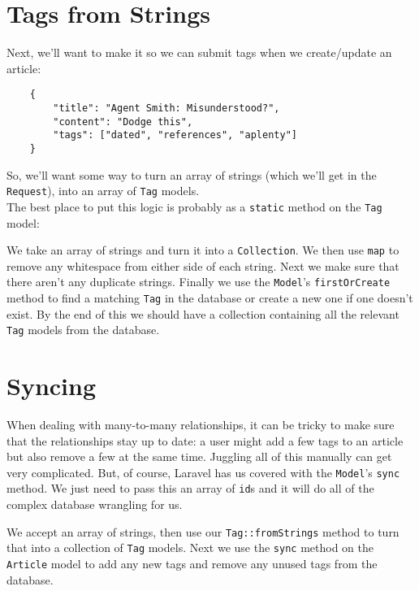 \pagebreak


\section{Tags from Strings}

Next, we'll want to make it so we can submit tags when we create/update an article:

\begin{verbatim}
    {
        "title": "Agent Smith: Misunderstood?",
        "content": "Dodge this",
        "tags": ["dated", "references", "aplenty"]
    }
\end{verbatim}


So, we'll want some way to turn an array of strings (which we'll get in the \texttt{Request}), into an array of \texttt{Tag} models.
\\

The best place to put this logic is probably as a \texttt{static} method on the \texttt{Tag} model:


We take an array of strings and turn it into a \texttt{Collection}. We then use \texttt{map} to remove any whitespace from either side of each string. Next we make sure that there aren't any duplicate strings. Finally we use the \texttt{Model}'s \texttt{firstOrCreate} method to find a matching \texttt{Tag} in the database or create a new one if one doesn't exist. By the end of this we should have a collection containing all the relevant \texttt{Tag} models from the database.


\section{Syncing}

When dealing with many-to-many relationships, it can be tricky to make sure that the relationships stay up to date: a user might add a few tags to an article but also remove a few at the same time. Juggling all of this manually can get very complicated. But, of course, Laravel has us covered with the \texttt{Model}'s \texttt{sync} method. We just need to pass this an array of \texttt{id}s and it will do all of the complex database wrangling for us.

\pagebreak


We accept an array of strings, then use our \texttt{Tag::fromStrings} method to turn that into a collection of \texttt{Tag} models. Next we use the \texttt{sync} method on the \texttt{Article} model to add any new tags and remove any unused tags from the database.



